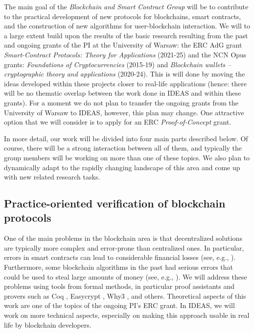 \documentclass{article}
\begin{document}
The main goal of the \emph{Blockchain and Smart Contract Group} will be to contribute to the practical development of new protocols for blockchains, smart contracts, and the construction of new algorithms for user-blockchain interaction. 
We will to a large extent build upon the results of the basic research resulting from the past and ongoing grants of the PI at the University of Warsaw: the ERC AdG grant \emph{Smart-Contract Protocols: Theory for Applications} (2021-25) and the NCN Opus grants: \emph{Foundations of Cryptocurrencies} (2015-19) and \emph{Blockchain wallets -- cryptographic theory and applications} (2020-24). This is will done by moving the ideas developed within these projects closer to real-life applications (hence: there will be no thematic overlap between the work done in IDEAS and within these grants). For a moment we do not plan to transfer the ongoing grants from the University of Warsaw to IDEAS, however, this plan may change. One attractive option that we will consider is to apply for an ERC \emph{Proof-of-Concept} grant.

In more detail, our work will be divided into four main parts described below. Of course, there will be a strong interaction between all of them, and typically the group members will be working on more than one of these topics. We also plan to dynamically adapt to the rapidly changing landscape of this area and come up with new related research tasks.




\subsection{Practice-oriented verification of blockchain protocols}\label{sec:verif}

One of the main problems in the blockchain area is that decentralized solutions are typically more complex and error-prone than centralized ones. In particular, errors in smart contracts can lead to considerable financial losses (see, e.g., \cite{DAO}). Furthermore, some blockchain algorithms in the past had serious errors that could be used to steal large amounts of money (see, e.g., \cite{HACKETT}).  We will address these problems using tools from formal methods, in particular proof assistants and provers such as Coq \cite{Chlipala2013}, Easycrypt \cite{Barthe2013}, Why3 \cite{Santos2015}, and others. Theoretical aspects of this work are one of the topics of the ongoing PI's ERC grant. In IDEAS, we will work on more technical aspects, especially on making this approach usable in real life by blockchain developers.
\end{document}

